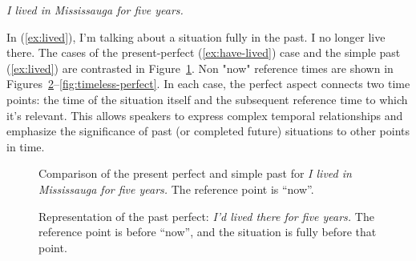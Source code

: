 \ea \textit{I lived in Mississauga for five years.}\label{ex:lived}
\z

In (\ref{ex:lived}), I'm talking about a situation fully in the past. I no longer live there. The cases of the present-perfect (\ref{ex:have-lived}) case and the simple past (\ref{ex:lived}) are contrasted in Figure~\ref{fig:past-vs-present-perfect}. Non "now" reference times are shown in Figures~\ref{fig:past-perfect}--\ref{fig:timeless-perfect}. In each case, the perfect aspect connects two time points: the time of the situation itself and the subsequent reference time to which it's relevant. This allows speakers to express complex temporal relationships and emphasize the significance of past (or completed future) situations to other points in time.

\begin{figure}[ht]
    \centering
    \caption{Comparison of the present perfect and simple past for \textit{I lived in Mississauga for five years.} The reference point is ``now''.}
    \label{fig:past-vs-present-perfect}
\end{figure}

\begin{figure}[ht]
    \centering
    \caption{Representation of the past perfect: \textit{I'd lived there for five years.} The reference point is before ``now'', and the situation is fully before that point.}
    \label{fig:past-perfect}
\end{figure}

